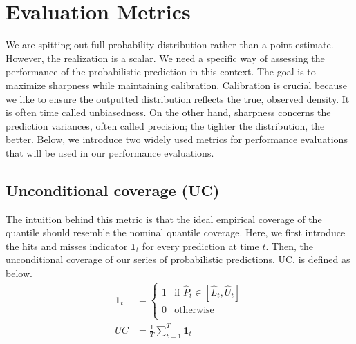 \documentclass[11pt, letterpaper, journal]{IEEEtran}
\begin{document}
\section{Evaluation Metrics}
We are spitting out full probability distribution rather than a point estimate. However, the realization is a scalar. We need a specific way of assessing the performance of the probabilistic prediction in this context. The goal is to maximize sharpness while maintaining calibration. Calibration is crucial because we like to ensure the outputted distribution reflects the true, observed density. It is often time called unbiasedness. On the other hand, sharpness concerns the prediction variances, often called precision; the tighter the distribution, the better. Below, we introduce two widely used metrics for performance evaluations that will be used in our performance evaluations.

\subsection{Unconditional coverage (UC)}
The intuition behind this metric is that the ideal empirical coverage of the quantile should resemble the nominal quantile coverage. Here, we first introduce the hits and misses indicator $\mathbf{1}_t$ for every prediction at time $t$. Then, the unconditional coverage of our series of probabilistic predictions, UC, is defined as below.
\begin{align*}
    \mathbf{1}_t &= \begin{cases}
        1 & \text{if $\hat{P}_t \in [\hat{L}_t, \hat{U}_t]$} \\
        0 & \text{otherwise} \\
    \end{cases} \\
    UC &= \frac{1}{T}\sum_{t=1}^T \mathbf{1}_t
\end{align*}
\end{document}
